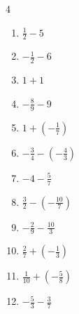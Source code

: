 \begin{multicols}{4}
\begin{enumerate}
  \item $\displaystyle \frac{1}{2} - 5$


\columnbreak %

  \item $\displaystyle -\frac{1}{2} - 6$


  \item $\displaystyle 1 + 1$

        \phantom{$\displaystyle =2$}

  \item $\displaystyle -\frac{8}{9} - 9$


  \item $\displaystyle 1 + \left(-\frac{1}{7}\right)$


  \item $\displaystyle -\frac{3}{4} - \left(-\frac{4}{3}\right)$


  \item $\displaystyle -4 - \frac{5}{7}$


  \item $\displaystyle \frac{3}{2} - \left(-\frac{10}{7}\right)$


  \item $\displaystyle -\frac{2}{9} - \frac{10}{3}$


  \item $\displaystyle \frac{2}{7} + \left(-\frac{1}{3}\right)$


  \item $\displaystyle \frac{1}{10} + \left(-\frac{5}{8}\right)$


\columnbreak %

  \item $\displaystyle -\frac{5}{3} - \frac{3}{7}$


\end{enumerate}
\end{multicols}
